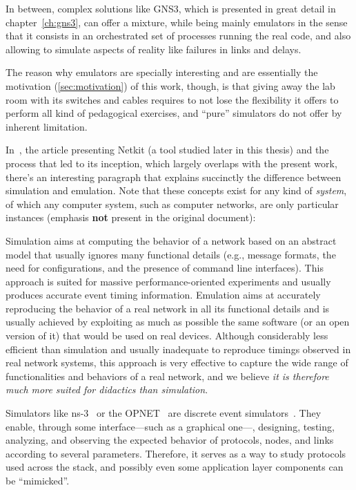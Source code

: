 In between, complex solutions like GNS3, which is presented in great detail in chapter~\ref{ch:gns3}, can offer a mixture, while being mainly emulators in the sense that it consists in an orchestrated set of processes running the real code, and also allowing to simulate aspects of reality like failures in links and delays.

The reason why emulators are specially interesting and are essentially the motivation (\ref{sec:motivation}) of this work, though, is that giving away the lab room with its switches and cables requires to not lose the flexibility it offers to perform all kind of pedagogical exercises, and ``pure'' simulators do not offer by inherent limitation.

In~\cite{netkit-full}, the article presenting Netkit (a tool studied later in this thesis) and the process that led to its inception, which largely overlaps with the present work, there's an interesting paragraph that explains succinctly the difference between simulation and emulation.
Note that these concepts exist for any kind of \emph{system}, of which any computer system, such as computer networks, are only particular instances (emphasis \textbf{not} present in the original document):
\begin{displayquote}
Simulation aims at computing the behavior of a network based on an abstract model that usually ignores many functional details (e.g., message formats, the need for configurations, and the presence of command line interfaces).
This approach is suited for massive performance-oriented experiments and usually produces accurate event timing information.
Emulation aims at accurately reproducing the behavior of a real network in all its functional details and is usually achieved by exploiting as much as possible the same software (or an open version of it) that would be used on real devices.
Although considerably less efficient than simulation and usually inadequate to reproduce timings observed in real network systems, this approach is very effective to capture the wide range of functionalities and behaviors of a real network, and we believe \emph{it is therefore much more suited for didactics than simulation}.
\end{displayquote}
Simulators like ns-3~\cite{ns3} or the OPNET~\cite{introtoopnet} are discrete event simulators~\cite{netsimoremu}.
They enable, through some interface---such as a graphical one---, designing, testing, analyzing, and observing the expected behavior of protocols, nodes, and links according to several parameters. Therefore, it serves as a way to study protocols used across the stack, and possibly even some application layer components can be ``mimicked''.

